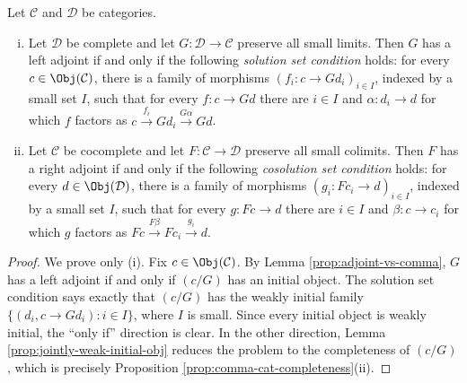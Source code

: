\begin{theorem}\label{prop:GAFT}
	Let $\mathcal{C}$ and $\mathcal{D}$ be categories.
	\begin{enumerate}[(i)]
		\item Let $\mathcal{D}$ be complete and let
		$G:\mathcal{D}\to\mathcal{C}$ preserve all small limits. Then $G$ has
		a left adjoint if and only if the following \emph{solution set
		condition} holds: for every $c\in\Obj(\mathcal{C})$, there is a family
		of morphisms $(f_i:c\to Gd_i)_{i\in I}$, indexed by a small set $I$,
		such that for every $f:c\to Gd$ there are $i\in I$ and
		$\alpha:d_i\to d$ for which $f$ factors as
		$c\xrightarrow{f_i}Gd_i\xrightarrow{G\alpha}Gd$.
		\item Let $\mathcal{C}$ be cocomplete and let
		$F:\mathcal{C}\to\mathcal{D}$ preserve all small colimits. Then $F$ has
		a right adjoint if and only if the following \emph{cosolution set
		condition} holds: for every $d\in\Obj(\mathcal{D})$, there is a family
		of morphisms $(g_i:Fc_i\to d)_{i\in I}$, indexed by a small set $I$,
		such that for every $g:Fc\to d$ there are $i\in I$ and
		$\beta:c\to c_i$ for which $g$ factors as
		$Fc\xrightarrow{F\beta}Fc_i\xrightarrow{g_i}d$.
	\end{enumerate}
\end{theorem}
\begin{proof}
	We prove only (i). Fix $c\in\Obj(\mathcal{C})$. By Lemma
	\ref{prop:adjoint-vs-comma}, $G$ has a left adjoint if and only if $(c/G)$
	has an initial object. The solution set condition says exactly that $(c/G)$
	has the weakly initial family
	$\{(d_i,c\to Gd_i):i\in I\}$, where $I$ is small. Since every initial
	object is weakly initial, the ``only if'' direction is clear. In the other
	direction, Lemma \ref{prop:jointly-weak-initial-obj} reduces the problem to
	the completeness of $(c/G)$, which is precisely Proposition
	\ref{prop:comma-cat-completeness}(ii).
\end{proof}

